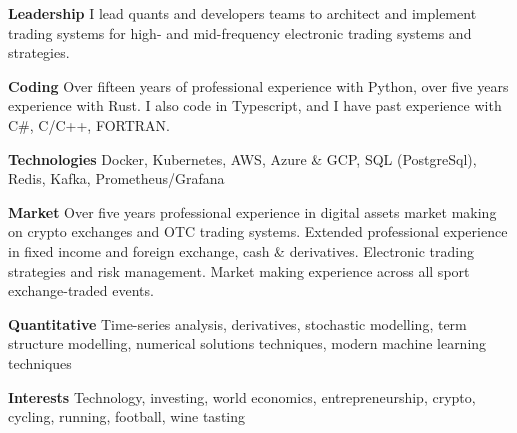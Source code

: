 {\bf Leadership} I lead quants and developers teams to architect and implement trading systems for high- and mid-frequency electronic trading systems and strategies.

{\bf Coding} Over fifteen years of professional experience with Python, over five years experience with Rust.
I also code in Typescript, and I have past experience with C\#, C/C++, FORTRAN.

{\bf Technologies} Docker, Kubernetes, AWS, Azure \& GCP, SQL (PostgreSql), Redis, Kafka, Prometheus/Grafana

{\bf Market} Over five years professional experience in digital assets market making on crypto exchanges and OTC trading systems.
Extended professional experience in fixed income and foreign exchange, cash \& derivatives.
Electronic trading strategies and risk management.
Market making experience across all sport exchange-traded events.

{\bf Quantitative} Time-series analysis, derivatives, stochastic modelling, term structure modelling, numerical solutions techniques, modern machine learning techniques

{\bf Interests} Technology, investing, world economics, entrepreneurship, crypto, cycling, running, football, wine tasting
